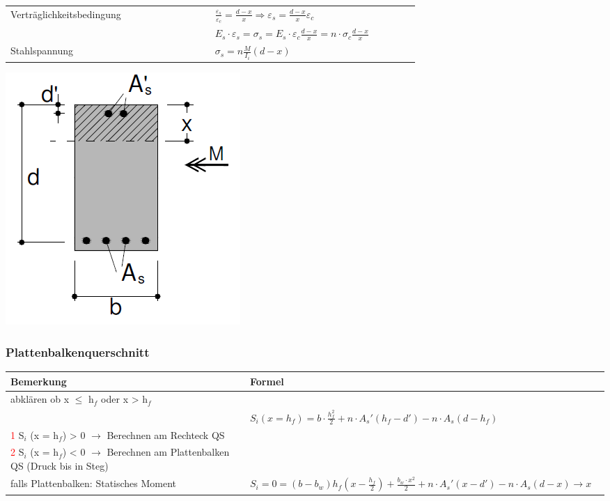 \begin{landscape}
\begin{multicols}{3}
\begin{tabular}{p{0.4\linewidth}|p{0.4\linewidth}}
		\hspace*{0pt} Verträglichkeitsbedingung & $ \frac{\varepsilon_s}{\varepsilon_c} = \frac{d - x}{x}
		\Rightarrow \varepsilon_s = \frac{d - x}{x} \varepsilon_c $	 \\
		& $ E_s \cdot \varepsilon_s = \sigma_s = E_s \cdot \varepsilon_c \frac{d - x}{x} = n \cdot \sigma_c \frac{d - x}{x} $		\\
		
		Stahlspannung			& $ \sigma_s = n \frac{M}{I_i} (d - x) $	 \\
		
	\end{tabular}


	\includegraphics[width=0.4\linewidth]{images/Risse3QSRechteckm.PNG}





\subsubsection{Plattenbalkenquerschnitt}


	\begin{tabular}{p{0.4\linewidth}|p{0.6\linewidth}}
		
		Bemerkung		& Formel	 \\ \hline
		
		
		abklären ob x $ \leq $ h$_f$ oder x > h$_f$ & \\
		
		& $ S_i (x = h_f) =  b \cdot \frac{h_f^2}{2} + n \cdot A_s' (h_f - d') - n \cdot A_s (d - h_f)  $   \\
		\textcolor{red}{1} S$_i$ (x = h$_f$) > 0 $ \rightarrow $ Berechnen am Rechteck QS &	 \\
		\textcolor{red}{2} S$_i$ (x = h$_f$) < 0 $ \rightarrow $ Berechnen am Plattenbalken QS (Druck bis in Steg) &	 \\
		
		falls Plattenbalken: Statisches Moment	& $ S_i = 0 = (b - b_w) h_f \left( x - \frac{h_f}{2} \right) + \frac{b_w \cdot x^2}{2} + n \cdot A_s' (x - d') - n \cdot A_s (d - x) \rightarrow x $  \\
		

\end{tabular}
\end{multicols}
\end{landscape}
